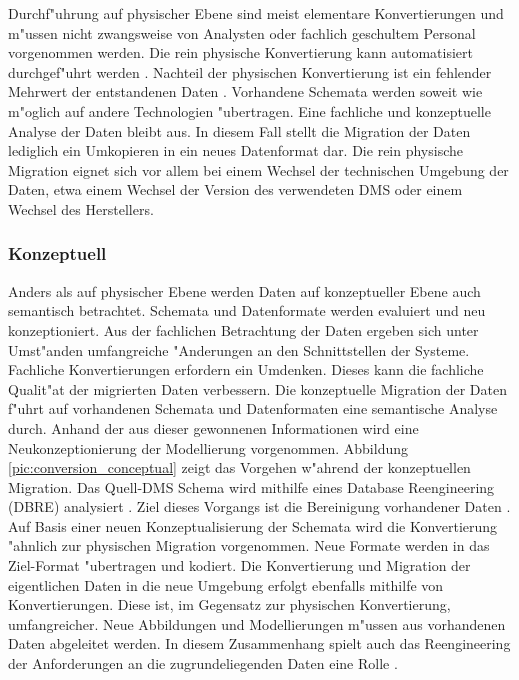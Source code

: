 Durchf"uhrung auf physischer Ebene sind meist elementare Konvertierungen und m"ussen nicht zwangsweise von Analysten oder fachlich geschultem Personal vorgenommen werden. Die rein physische Konvertierung kann automatisiert durchgef"uhrt werden \citep{abiteboul-1999}.
\lb
Nachteil der physischen Konvertierung ist ein fehlender Mehrwert der entstandenen Daten \citep{henrard-2002}. Vorhandene Schemata werden soweit wie m"oglich auf andere Technologien "ubertragen. Eine fachliche und konzeptuelle Analyse der Daten bleibt aus. In diesem Fall stellt die Migration der Daten lediglich ein Umkopieren in ein neues Datenformat dar.
\lb
Die rein physische Migration eignet sich vor allem bei einem Wechsel der technischen Umgebung der Daten, etwa einem Wechsel der Version des verwendeten DMS oder einem Wechsel des Herstellers.

\subsubsection{Konzeptuell}

Anders als auf physischer Ebene werden Daten auf konzeptueller Ebene auch semantisch betrachtet. Schemata und Datenformate werden evaluiert und neu konzeptioniert. Aus der fachlichen Betrachtung der Daten ergeben sich unter Umst"anden umfangreiche "Anderungen an den Schnittstellen der Systeme. Fachliche Konvertierungen erfordern ein Umdenken. Dieses kann die fachliche Qualit"at der migrierten Daten verbessern.
\lb
Die konzeptuelle Migration der Daten f"uhrt auf vorhandenen Schemata und Datenformaten eine semantische Analyse durch. Anhand der aus dieser gewonnenen Informationen wird eine Neukonzeptionierung der Modellierung vorgenommen. Abbildung \ref{pic:conversion_conceptual} zeigt das Vorgehen w"ahrend der konzeptuellen Migration. Das Quell-DMS Schema wird mithilfe eines Database Reengineering (DBRE) analysiert \citep{henrard-2002}. Ziel dieses Vorgangs ist die Bereinigung vorhandener Daten \citep{rahm-2010} \citep{hernandez-1998}. Auf Basis einer neuen Konzeptualisierung der Schemata wird die Konvertierung "ahnlich zur physischen Migration vorgenommen. Neue Formate werden in das Ziel-Format "ubertragen und kodiert. Die Konvertierung und Migration der eigentlichen Daten in die neue Umgebung erfolgt ebenfalls mithilfe von Konvertierungen. Diese ist, im Gegensatz zur physischen Konvertierung, umfangreicher. Neue Abbildungen und Modellierungen m"ussen aus vorhandenen Daten abgeleitet werden. In diesem Zusammenhang spielt auch das Reengineering der Anforderungen an die zugrundeliegenden Daten eine Rolle \citep{aiken-1994}.

